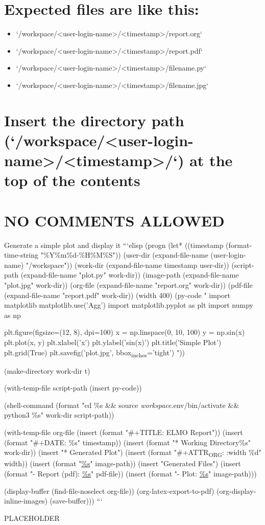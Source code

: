 \documentclass[11pt]{article}
\begin{document}
\section{Expected files are like this:}
\label{sec:org091cec7}
\begin{itemize}
\item `/workspace/<user-login-name>/<timestamp>/report.org`
\item `/workspace/<user-login-name>/<timestamp>/report.pdf`
\item `/workspace/<user-login-name>/<timestamp>/filename.py`
\item `/workspace/<user-login-name>/<timestamp>/filename.jpg`
\end{itemize}
\section{Insert the directory path (`/workspace/<user-login-name>/<timestamp>/`) at the top of the contents}
\label{sec:orgbc9043d}
\section{NO COMMENTS ALLOWED}
\label{sec:orgdf25f91}

Generate a simple plot and display it
```elisp
(progn
  (let* ((timestamp (format-time-string "\%Y\%m\%d-\%H\%M\%S"))
         (user-dir (expand-file-name (user-login-name) "/workspace"))
         (work-dir (expand-file-name timestamp user-dir))
         (script-path (expand-file-name "plot.py" work-dir))
         (image-path (expand-file-name "plot.jpg" work-dir))
         (org-file (expand-file-name "report.org" work-dir))
         (pdf-file (expand-file-name "report.pdf" work-dir))
         (width 400)
         (py-code "
import matplotlib
matplotlib.use('Agg')
import matplotlib.pyplot as plt
import numpy as np

plt.figure(figsize=(12, 8), dpi=100)
x = np.linspace(0, 10, 100)
y = np.sin(x)
plt.plot(x, y)
plt.xlabel('x')
plt.ylabel('sin(x)')
plt.title('Simple Plot')
plt.grid(True)
plt.savefig('plot.jpg', bbox\textsubscript{inches}='tight')
"))

(make-directory work-dir t)

(with-temp-file script-path
  (insert py-code))

(shell-command (format "cd \%s \&\& source \emph{workspace}.env/bin/activate \&\& python3 \%s" 
                      work-dir script-path))

(with-temp-file org-file
  (insert (format "\#+TITLE: ELMO Report\n"))
  (insert (format "\#+DATE: \%s\n\n" timestamp))
  (insert (format "* Working Directory\n\%s\n\n" work-dir))
  (insert "* Generated Plot\n")
  (insert (format "\#+ATTR\textsubscript{ORG}: :width \%d\n" width))
  (insert (format "\url{\%s}\n" image-path))
  (insert "\n* Generated Files\n")
  (insert (format "- Report (pdf): \url{\%s}\n" pdf-file))
  (insert (format "- Plot: \url{\%s}\n" image-path)))

    (display-buffer (find-file-noselect org-file))
    (org-latex-export-to-pdf)
    (org-display-inline-images)
    (save-buffer)))
```

PLACEHOLDER
\end{document}
